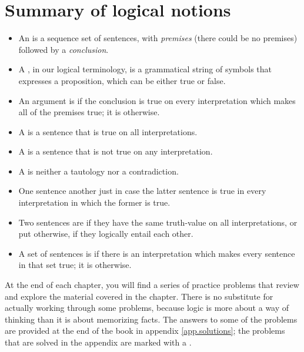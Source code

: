 \section*{Summary of logical notions}
\begin{itemize}

\item An  is a sequence set of sentences, with \emph{premises} (there could be no premises) followed by a \emph{conclusion}.

\item A , in our logical terminology, is a grammatical string of symbols that expresses a proposition, which can be either true or false.

\item An argument is  if the conclusion is true on every interpretation which makes all of the premises true; it is  otherwise.

\item A  is a sentence that is true on all interpretations.

\item A  is a sentence that is not true on any interpretation.

\item A  is neither a tautology nor a contradiction.

\item One sentence  another just in case the latter sentence is true in every interpretation in which the former is true.

\item Two sentences are  if they have the same truth-value on all interpretations, or put otherwise, if they logically entail each other.

\item A set of sentences is  if there is an interpretation which makes every sentence in that set true; it is  otherwise.

\end{itemize}



\practiceproblems
At the end of each chapter, you will find a series of practice problems that review and explore the material covered in the chapter. There is no substitute for actually working through some problems, because logic is more about a way of thinking than it is about memorizing facts. The answers to some of the problems are provided at the end of the book in appendix \ref{app.solutions}; the problems that are solved in the appendix are marked with a \solutions.

